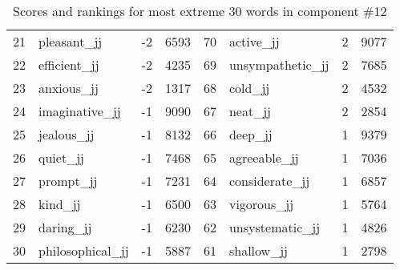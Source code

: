 \begin{table}[tbp]
\begin{tabular}{| rlr@{.}l | rlr@{.}l |}
    21 & pleasant\_jj & -2 & 6593    &    70 & active\_jj & 2 & 9077 \\
    22 & efficient\_jj & -2 & 4235    &    69 & unsympathetic\_jj & 2 & 7685 \\
    23 & anxious\_jj & -2 & 1317    &    68 & cold\_jj & 2 & 4532 \\
    24 & imaginative\_jj & -1 & 9090    &    67 & neat\_jj & 2 & 2854 \\
    25 & jealous\_jj & -1 & 8132    &    66 & deep\_jj & 1 & 9379 \\
    26 & quiet\_jj & -1 & 7468    &    65 & agreeable\_jj & 1 & 7036 \\
    27 & prompt\_jj & -1 & 7231    &    64 & considerate\_jj & 1 & 6857 \\
    28 & kind\_jj & -1 & 6500    &    63 & vigorous\_jj & 1 & 5764 \\
    29 & daring\_jj & -1 & 6230    &    62 & unsystematic\_jj & 1 & 4826 \\
    30 & philosophical\_jj & -1 & 5887    &    61 & shallow\_jj & 1 & 2798 \\
    \hline
    \end{tabular}
    \caption{Scores and rankings for most extreme 30 words in component \#12} 
\end{table}
\clearpage
